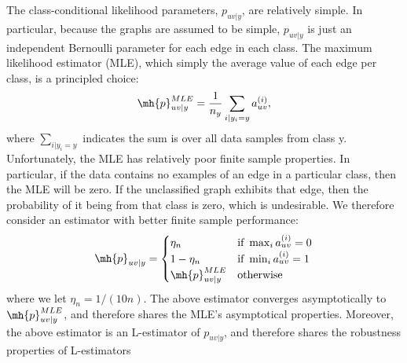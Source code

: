 \documentclass[10pt,journal,cspaper,compsoc]{IEEEtran}
\begin{document}
The class-conditional likelihood parameters, $p_{uv|y}$, are relatively simple.  In particular, because the graphs are assumed to be simple, $p_{uv|y}$ is just an independent Bernoulli parameter for each edge in each class.  The maximum likelihood estimator (MLE), which simply the average value of each edge per class, is a principled choice:
\begin{align}
\mh{p}_{uv|y}^{MLE} = \frac{1}{n_y} \sum_{i | y_i = y} a_{uv}^{(i)},
\end{align}
where $\sum_{i | y_i=y}$ indicates the sum is over all data samples from class y. Unfortunately, the MLE has relatively poor finite sample properties.  In particular, if the data contains no examples of an edge in a particular class, then the MLE will be zero.  If the unclassified graph exhibits that edge, then the probability of it being from that class is zero, which is undesirable. We therefore consider an estimator with better finite sample performance:
\begin{align}
\mh{p}_{uv|y} = 
\begin{cases}
\eta_n & \text{if } \max_i a_{uv}^{(i)}=0 \\
1- \eta_n & \text{if } \min_i a_{uv}^{(i)}=1 \\
\mh{p}_{uv|y}^{MLE} & \text{otherwise}
\end{cases}
\end{align}
where we let $\eta_n=1/(10n)$.  The above estimator converges asymptotically to $\mh{p}^{MLE}_{uv|y}$, and therefore shares the MLE's asymptotical properties.  Moreover, the above estimator is an L-estimator of $p_{uv|y}$, and therefore shares the robustness properties of L-estimators \cite{Huber1981}

\end{document}
